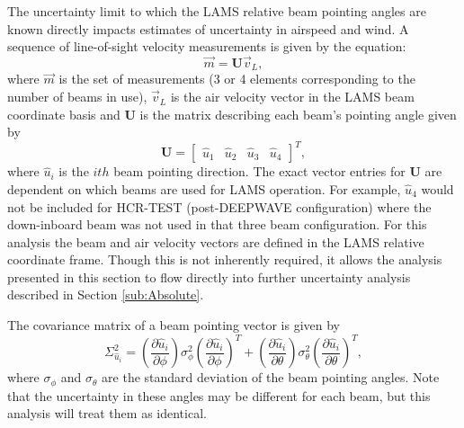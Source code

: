 \documentclass[12pt,twoside,english]{article}\usepackage[]{graphicx}\usepackage[]{color}
\begin{document}
The uncertainty limit to which the LAMS relative beam pointing angles are known directly impacts estimates of uncertainty in airspeed and wind. A sequence of line-of-sight velocity measurements is given by the equation:  
\begin{equation}
\vec{m}=\mathbf{U}\vec{v}_{L},\label{Vmeas}
\end{equation}
where $\vec{m}$ is the set of measurements (3 or 4 elements corresponding to the number of beams in use), $\vec{v}_{L}$ is the air velocity vector in the LAMS beam coordinate basis and $\mathbf{U}$ is the matrix describing each beam's pointing angle given by  
\begin{equation}
\mathbf{U}=\left[\begin{array}{cccc} \hat{u}_{1} & \hat{u}_{2} & \hat{u}_{3} & \hat{u}_{4}\end{array}\right]^{T},\label{Umatrix}
\end{equation}
where $\hat{u}_{i}$ is the $ith$ beam pointing direction. The exact vector entries for $\mathbf{U}$ are dependent on which beams are used for LAMS operation. For example, $\hat{u}_{4}$ would not be included for HCR-TEST (post-DEEPWAVE configuration) where the down-inboard beam was not used in that three beam configuration. For this analysis the beam and air velocity vectors are defined in the LAMS relative coordinate frame. Though this is not inherently required, it allows the analysis presented in this section to flow directly into further uncertainty analysis described in Section \ref{sub:Absolute}. 

The covariance matrix of a beam pointing vector is given by  
\begin{equation}
\Sigma_{\hat{u}_{i}}^{2}=\left(\frac{\partial\hat{u}_{i}}{\partial\phi}\right)\sigma_{\phi}^{2}\left(\frac{\partial\hat{u}_{i}}{\partial\phi}\right)^{T}+\left(\frac{\partial\hat{u}_{i}}{\partial\theta}\right)\sigma_{\theta}^{2}\left(\frac{\partial\hat{u}_{i}}{\partial\theta}\right)^{T},\label{CovUvec} 
\end{equation}
where $\sigma_{\phi}$ and $\sigma_{\theta}$ are the standard deviation of the beam pointing angles. Note that the uncertainty in these angles may be different for each beam, but this analysis will treat them as identical. 
\end{document}
